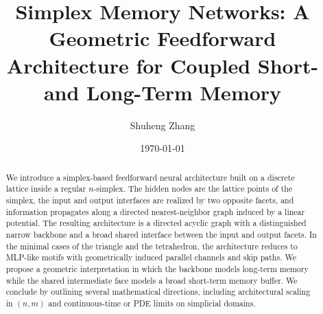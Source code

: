 \documentclass[11pt]{amsart}
\title[Simplex Memory Networks]{Simplex Memory Networks: A Geometric Feedforward Architecture for Coupled Short- and Long-Term Memory}
\author{Shuheng Zhang}
\date{\today}
\theoremstyle{definition}
\newcommand{\1}{\mathbf{1}}
\begin{document}
\begin{abstract}
We introduce a simplex-based feedforward neural architecture built on a discrete lattice inside a regular $n$-simplex. The hidden nodes are the lattice points of the simplex, the input and output interfaces are realized by two opposite facets, and information propagates along a directed nearest-neighbor graph induced by a linear potential. The resulting architecture is a directed acyclic graph with a distinguished narrow backbone and a broad shared interface between the input and output facets. In the minimal cases of the triangle and the tetrahedron, the architecture reduces to MLP-like motifs with geometrically induced parallel channels and skip paths. We propose a geometric interpretation in which the backbone models long-term memory while the shared intermediate face models a broad short-term memory buffer. We conclude by outlining several mathematical directions, including architectural scaling in $(n,m)$ and continuous-time or PDE limits on simplicial domains.
\end{abstract}

\maketitle

\tableofcontents











\end{document}
